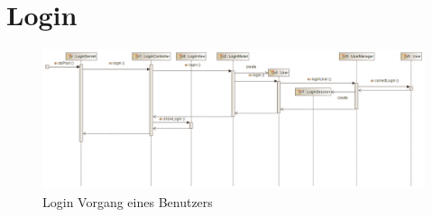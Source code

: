 \section{Login}


\begin{figure}[h]
\centering
\includegraphics[width=1.0\linewidth]{Grafik/Sequenzdiagramme/Login.png}
 \caption{Login Vorgang eines Benutzers}
\end{figure}